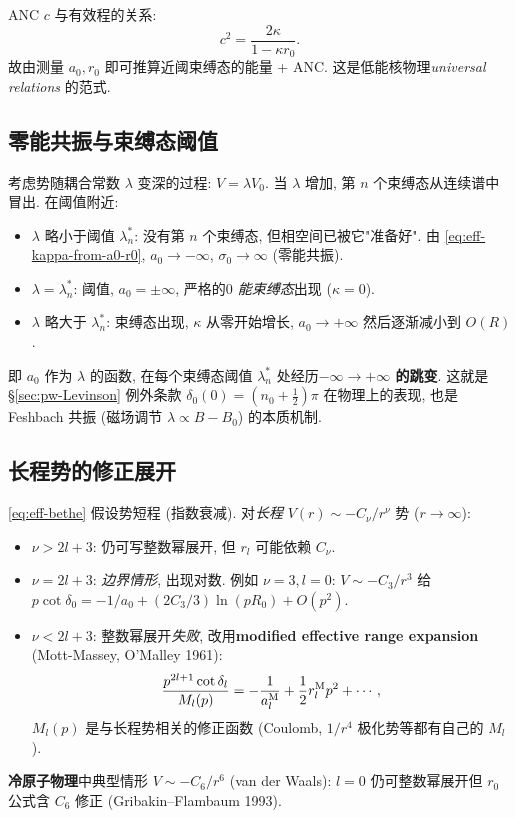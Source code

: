 ANC $c$ 与有效程的关系:
\begin{equation}
  c^2=\frac{2\kappa}{1-\kappa r_0}.
  \label{eq:eff-ANC-r0}
\end{equation}
故由测量 $a_0,r_0$ 即可推算近阈束缚态的能量 + ANC. 这是低能核物理\emph{universal relations} 的范式.

\subsection{零能共振与束缚态阈值}\label{sec:eff-range-zero}

考虑势随耦合常数 $\lambda$ 变深的过程: $V=\lambda V_0$. 当 $\lambda$ 增加, 第 $n$ 个束缚态从连续谱中冒出. 在阈值附近:
\begin{itemize}
  \item $\lambda$ 略小于阈值 $\lambda_n^*$: 没有第 $n$ 个束缚态, 但相空间已被它"准备好". 由 \eqref{eq:eff-kappa-from-a0-r0}, $a_0\to-\infty$, $\sigma_0\to\infty$ (零能共振).
  \item $\lambda=\lambda_n^*$: 阈值, $a_0=\pm\infty$, 严格的\emph{$0$ 能束缚态}出现 ($\kappa=0$).
  \item $\lambda$ 略大于 $\lambda_n^*$: 束缚态出现, $\kappa$ 从零开始增长, $a_0\to+\infty$ 然后逐渐减小到 $O(R)$.
\end{itemize}
即 $a_0$ 作为 $\lambda$ 的函数, 在每个束缚态阈值 $\lambda_n^*$ 处经历\textbf{$-\infty\to+\infty$ 的跳变}. 这就是 \S\ref{sec:pw-Levinson} 例外条款 $\delta_0(0)=(n_0+\tfrac12)\pi$ 在物理上的表现, 也是 Feshbach 共振 (磁场调节 $\lambda\propto B-B_0$) 的本质机制.

\subsection{长程势的修正展开}\label{sec:eff-range-long-range}

\eqref{eq:eff-bethe} 假设势短程 (指数衰减). 对\emph{长程} $V(r)\sim -C_\nu/r^\nu$ 势 ($r\to\infty$):
\begin{itemize}
  \item $\nu>2l+3$: 仍可写整数幂展开, 但 $r_l$ 可能依赖 $C_\nu$.
  \item $\nu=2l+3$: \emph{边界情形}, 出现对数. 例如 $\nu=3, l=0$: $V\sim -C_3/r^3$ 给 $p\cot\delta_0=-1/a_0+(2 C_3/3)\ln(pR_0)+O(p^2)$.
  \item $\nu<2l+3$: 整数幂展开\emph{失败}, 改用\textbf{modified effective range expansion} (Mott-Massey, O'Malley 1961):
    \begin{equation}
      \frac{p^{2l+1}\cot\delta_l}{M_l(p)}=-\frac{1}{a_l^{\rm M}}+\frac{1}{2}r_l^{\rm M}p^2+\cdots,
    \end{equation}
    $M_l(p)$ 是与长程势相关的修正函数 (Coulomb, $1/r^4$ 极化势等都有自己的 $M_l$).
\end{itemize}
\textbf{冷原子物理}中典型情形 $V\sim -C_6/r^6$ (van der Waals): $l=0$ 仍可整数幂展开但 $r_0$ 公式含 $C_6$ 修正 (Gribakin--Flambaum 1993).

